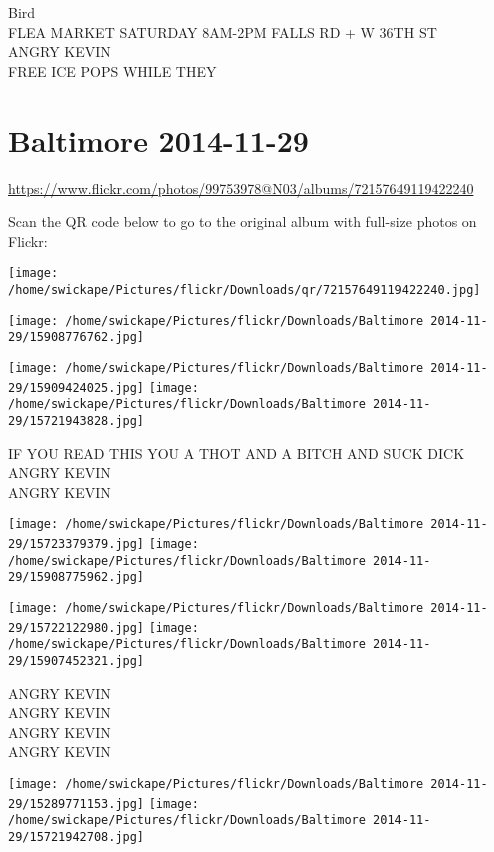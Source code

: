 \documentclass[10pt,letterpaper]{article}
\begin{document}
Bird\\
FLEA MARKET SATURDAY 8AM{-}2PM FALLS RD + W 36TH ST\\
ANGRY KEVIN\\
FREE ICE POPS WHILE THEY
\pagebreak

\section*{Baltimore 2014-11-29}

\url{https://www.flickr.com/photos/99753978@N03/albums/72157649119422240}

Scan the QR code below to go to the original album with full-size photos on Flickr:

\texttt{[image: /home/swickape/Pictures/flickr/Downloads/qr/72157649119422240.jpg]}
\pagebreak

\texttt{[image: /home/swickape/Pictures/flickr/Downloads/Baltimore 2014-11-29/15908776762.jpg]}

\vspace{0.25in}
\texttt{[image: /home/swickape/Pictures/flickr/Downloads/Baltimore 2014-11-29/15909424025.jpg]}
\texttt{[image: /home/swickape/Pictures/flickr/Downloads/Baltimore 2014-11-29/15721943828.jpg]}

IF YOU READ THIS YOU A THOT AND A BITCH AND SUCK DICK\\
ANGRY KEVIN\\
ANGRY KEVIN
\pagebreak

\texttt{[image: /home/swickape/Pictures/flickr/Downloads/Baltimore 2014-11-29/15723379379.jpg]}
\texttt{[image: /home/swickape/Pictures/flickr/Downloads/Baltimore 2014-11-29/15908775962.jpg]}

\texttt{[image: /home/swickape/Pictures/flickr/Downloads/Baltimore 2014-11-29/15722122980.jpg]}
\texttt{[image: /home/swickape/Pictures/flickr/Downloads/Baltimore 2014-11-29/15907452321.jpg]}

ANGRY KEVIN\\
ANGRY KEVIN\\
ANGRY KEVIN\\
ANGRY KEVIN
\pagebreak

\texttt{[image: /home/swickape/Pictures/flickr/Downloads/Baltimore 2014-11-29/15289771153.jpg]}
\texttt{[image: /home/swickape/Pictures/flickr/Downloads/Baltimore 2014-11-29/15721942708.jpg]}
\end{document}
